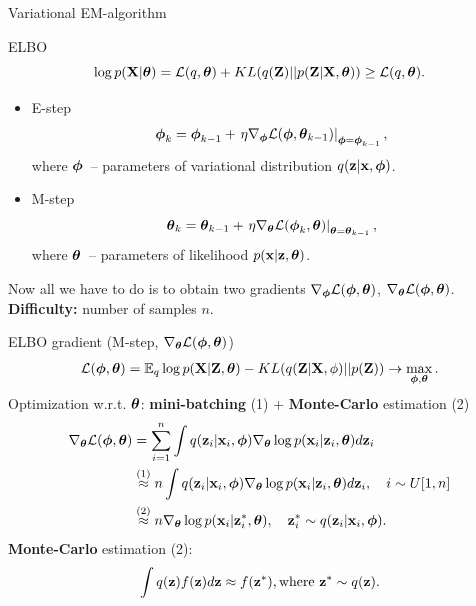 \begin{frame}{Variational EM-algorithm}

	\begin{block}{ELBO}
		\vspace{-0.1cm}
		\[
		\log p(\mathbf{X}| \boldsymbol{\theta}) = \mathcal{L} (q, \boldsymbol{\theta}) + KL(q(\mathbf{Z}) || p(\mathbf{Z}|\mathbf{X}, \boldsymbol{\theta})) \geq \mathcal{L} (q, \boldsymbol{\theta}).
		\]
	\end{block}
	\begin{itemize}
		\item E-step
		\[
		\boldsymbol{\phi}_k = \boldsymbol{\phi}_{k-1} + \left.\eta \nabla_{\boldsymbol{\phi}} \mathcal{L}(\boldsymbol{\phi}, \boldsymbol{\theta}_{k-1})\right|_{\boldsymbol{\phi}=\boldsymbol{\phi}_{k-1}},
		\]
		where $\boldsymbol{\phi}$~-- parameters of variational distribution $q(\mathbf{z} | \mathbf{x}, \boldsymbol{\phi})$.
		\item M-step
		\[
		\boldsymbol{\theta}_k = \boldsymbol{\theta}_{k-1} + \left.\eta \nabla_{\boldsymbol{\theta}} \mathcal{L}(\boldsymbol{\phi}_k, \boldsymbol{\theta})\right|_{\boldsymbol{\theta}=\boldsymbol{\theta}_{k-1}},
		\]
		where $\boldsymbol{\theta}$~-- parameters of likelihood $p(\mathbf{x} | \mathbf{z}, \boldsymbol{\theta})$.
	\end{itemize}
	Now all we have to do is to obtain two gradients $\nabla_{\boldsymbol{\phi}} \mathcal{L}(\boldsymbol{\phi}, \boldsymbol{\theta})$, $\nabla_{\boldsymbol{\theta}} \mathcal{L}(\boldsymbol{\phi}, \boldsymbol{\theta})$.  \\
	\textbf{Difficulty:} number of samples $n$.
\end{frame}
\begin{frame}{ELBO gradient (M-step, $\nabla_{\boldsymbol{\theta}} \mathcal{L}(\boldsymbol{\phi}, \boldsymbol{\theta})$)}
\vspace{-0.3cm}
\[
	\mathcal{L} (\boldsymbol{\phi}, \boldsymbol{\theta})  = \mathbb{E}_{q} \log p(\mathbf{X} | \mathbf{Z}, \boldsymbol{\theta}) - KL (q(\mathbf{Z}| \mathbf{X}, \phi) || p(\mathbf{Z})) \rightarrow \max_{\boldsymbol{\phi}, \boldsymbol{\theta}}.
\]
Optimization w.r.t. $\boldsymbol{\theta}$: \textbf{mini-batching} (1) + \textbf{Monte-Carlo} estimation (2)
\begin{align*}
	\nabla_{\boldsymbol{\theta}} \mathcal{L} (\boldsymbol{\phi}, \boldsymbol{\theta})
	&= \sum_{i=1}^n \int q(\mathbf{z}_i|\mathbf{x}_i, \boldsymbol{\phi}) \nabla_{\boldsymbol{\theta}}\log p(\mathbf{x}_i|\mathbf{z}_i, \boldsymbol{\theta})  d \mathbf{z}_i \\
	&\mathrel{\stackrel{\rm (1)}\approx} n\int q(\mathbf{z}_i|\mathbf{x}_i, \boldsymbol{\phi}) \nabla_{\boldsymbol{\theta}}\log p(\mathbf{x}_i|\mathbf{z}_i, \boldsymbol{\theta}) d \mathbf{z}_i , \quad i \sim U[1, n] \\
	&\mathrel{\stackrel{\rm (2)}\approx}  n \nabla_{\boldsymbol{\theta}}\log p(\mathbf{x}_i|\mathbf{z}^*_i, \boldsymbol{\theta}), \quad \mathbf{z}^*_i \sim q(\mathbf{z}_i|\mathbf{x}_i, \boldsymbol{\phi}).
\end{align*}
\textbf{Monte-Carlo} estimation (2):
\[
	\int q(\mathbf{z}) f(\mathbf{z}) d\mathbf{z} \approx f(\mathbf{z}^*), \text{where } \mathbf{z}^* \sim q(\mathbf{z}).
\]
\end{frame}
